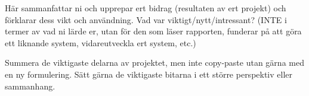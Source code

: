 Här sammanfattar ni och upprepar ert bidrag (resultaten av ert projekt) och förklarar dess vikt och användning.  Vad var viktigt/nytt/intressant?  (INTE i termer av vad ni lärde er, utan för den som läser rapporten, funderar på att göra ett liknande system, vidareutveckla ert system, etc.)

Summera de viktigaste delarna av projektet, men inte copy-paste utan gärna med en ny formulering. Sätt gärna de viktigaste bitarna i ett större perspektiv eller sammanhang.

